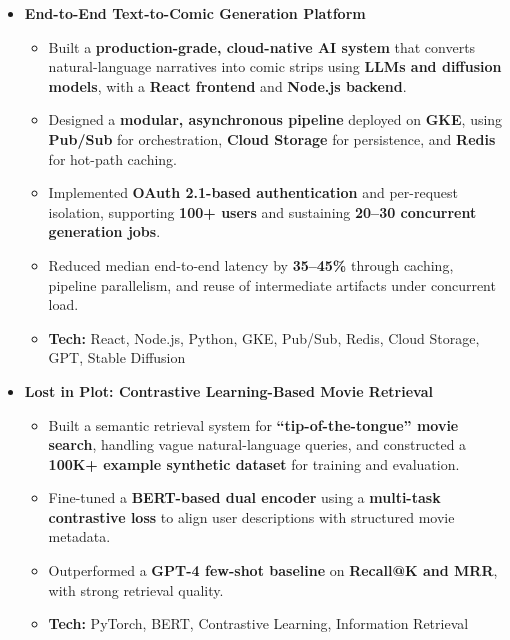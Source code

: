 \documentclass[a4paper,11pt]{article}
\begin{document}
\begin{itemize}
  \item \textbf{End-to-End Text-to-Comic Generation Platform}
    \begin{itemize}[nosep, after=\strut, leftmargin=1.2em, itemsep=2pt]
      \item Built a \textbf{production-grade, cloud-native AI system} that converts natural-language narratives into comic strips using \textbf{LLMs and diffusion models}, with a \textbf{React frontend} and \textbf{Node.js backend}.
      \item Designed a \textbf{modular, asynchronous pipeline} deployed on \textbf{GKE}, using \textbf{Pub/Sub} for orchestration, \textbf{Cloud Storage} for persistence, and \textbf{Redis} for hot-path caching.
      \item Implemented \textbf{OAuth 2.1-based authentication} and per-request isolation, supporting \textbf{100+ users} and sustaining \textbf{20--30 concurrent generation jobs}.
      \item Reduced median end-to-end latency by \textbf{35--45\%} through caching, pipeline parallelism, and reuse of intermediate artifacts under concurrent load.
      \item \textbf{Tech:} React, Node.js, Python, GKE, Pub/Sub, Redis, Cloud Storage, GPT, Stable Diffusion
    \end{itemize}

  \item \textbf{Lost in Plot: Contrastive Learning-Based Movie Retrieval}
    \begin{itemize}[nosep, after=\strut, leftmargin=1.2em, itemsep=2pt]
      \item Built a semantic retrieval system for \textbf{“tip-of-the-tongue” movie search}, handling vague natural-language queries, and constructed a \textbf{100K+ example synthetic dataset} for training and evaluation.
      \item Fine-tuned a \textbf{BERT-based dual encoder} using a \textbf{multi-task contrastive loss} to align user descriptions with structured movie metadata.
      \item Outperformed a \textbf{GPT-4 few-shot baseline} on \textbf{Recall@K and MRR}, with strong retrieval quality.
      \item \textbf{Tech:} PyTorch, BERT, Contrastive Learning, Information Retrieval
    \end{itemize}

\end{itemize}

\color{BlueViolet}
\end{document}
